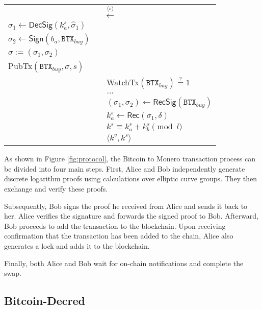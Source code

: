 \documentclass[twocolumn]{article}
\newcommand{\BTX}{\texttt{BTX}}
\newcommand{\DecSig}{\textsf{DecSig}}
\newcommand{\Sign}{\textsf{Sign}}
\newcommand{\Rec}{\textsf{Rec}}
\newcommand{\hatsigma}{\hat{\sigma}}
\newcommand{\PubTx}{\textsf{PubTx}}
\newcommand{\WatchTx}{\textsf{WatchTx}}
\newcommand{\RecSig}{\textsf{RecSig}}
\begin{document}
\begin{figure*}[h]
\begin{table}[H]
{\begin{tabular}{ | l c l | }
          \multicolumn{3}{|c|}{$\xleftarrow{\langle s \rangle}$} \\

          $\sigma_1 \gets \DecSig(k^s_a, \hatsigma_1)$ & & \\
          $\sigma_2 \gets \Sign(b_a, \BTX_\textit{buy})$ & & \\
          $\sigma := (\sigma_1, \sigma_2)$ & & \\
          \PubTx$(\BTX_\textit{buy}, \sigma, s)$ & & \\

          & & \WatchTx$(\BTX_\textit{buy}) \stackrel{?}{=} 1$ \\
          \multicolumn{3}{|c|}{$\dots$} \\

          & & $(\sigma_1, \sigma_2) \gets \RecSig(\BTX_\textit{buy})$ \\
          & & $k^s_a \gets \Rec(\sigma_1, \delta)$ \\
          & & $k^s \equiv k^s_a + k^s_b \pmod l$ \\
          & & $\langle k^v, k^s \rangle$ \\
        \hline
      \end{tabular}}
    \end{table}
  \caption{Protocol execution between Alice and Bob for a successful swap \cite{grover2018bitcoin}}
  \label{fig:protocol}
\end{figure*}

As shown in Figure \ref{fig:protocol}, the Bitcoin to Monero transaction process can be divided into four main steps. First, Alice and Bob independently generate discrete logarithm proofs using calculations over elliptic curve groups. They then exchange and verify these proofs.

Subsequently, Bob signs the proof he received from Alice and sends it back to her. Alice verifies the signature and forwards the signed proof to Bob. Afterward, Bob proceeds to add the transaction to the blockchain. Upon receiving confirmation that the transaction has been added to the chain, Alice also generates a lock and adds it to the blockchain.

Finally, both Alice and Bob wait for on-chain notifications and complete the swap.

\subsection{Bitcoin-Decred}
\end{document}
